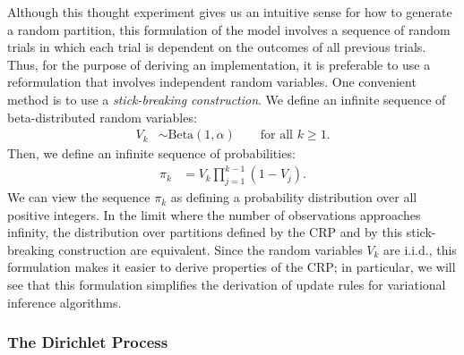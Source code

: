 \documentclass{article}
\begin{document}
Although this thought experiment gives us an intuitive sense for how to generate a random partition, this formulation of the model involves a sequence of random trials in which each trial is dependent on the outcomes of all previous trials.
Thus, for the purpose of deriving an implementation, it is preferable to use a reformulation that involves independent random variables.
One convenient method is to use a \emph{stick-breaking construction}.
We define an infinite sequence of beta-distributed random variables:
\begin{align}
V_k &\sim \text{Beta}(1, \alpha) \qquad \text{for all $k \geq 1$}.
\end{align}
Then, we define an infinite sequence of probabilities:
\begin{align}
\pi_k &= V_k \prod_{j=1}^{k-1} (1-V_j).
\label{eq:pi_crp}
\end{align}
We can view the sequence $\pi_k$ as defining a probability distribution over all positive integers.
In the limit where the number of observations approaches infinity, the distribution over partitions defined by the CRP and by this stick-breaking construction are equivalent.
Since the random variables $V_k$ are i.i.d., this formulation makes it easier to derive properties of the CRP; in particular, we will see that this formulation simplifies the derivation of update rules for variational inference algorithms.

\subsubsection{The Dirichlet Process}
\end{document}
